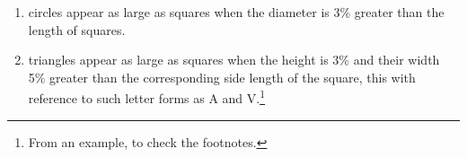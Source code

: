 \begin{multicols}{2}
\begin{enumerate}
\item circles appear as large as squares when the diameter is 3\% greater than the length of squares.
\item triangles appear as large as squares when the height is 3\% and their width 5\% greater than the corresponding side length of the square, this with reference to such letter forms as A and V.\footnote{From an example, to check the footnotes.}
\end{enumerate}

%
%
%
%
\end{multicols}












